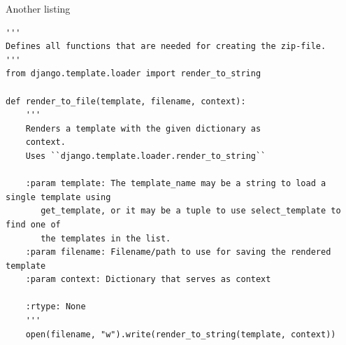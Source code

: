 Another listing

\lstset{tabsize=2,language=python}
\begin{lstlisting}[breaklines=true,frame=single,caption={Python file with doc-strings},label=lst:doc-string]
'''
Defines all functions that are needed for creating the zip-file.
'''
from django.template.loader import render_to_string

def render_to_file(template, filename, context):
    '''
    Renders a template with the given dictionary as
    context.
    Uses ``django.template.loader.render_to_string``

    :param template: The template_name may be a string to load a single template using
       get_template, or it may be a tuple to use select_template to find one of
       the templates in the list.       
    :param filename: Filename/path to use for saving the rendered template       
    :param context: Dictionary that serves as context

    :rtype: None
    '''
    open(filename, "w").write(render_to_string(template, context))
\end{lstlisting}

\begin{figure}[H]
\begin{center}
	\label{fig:api_render_to_file}
\end{center}
\end{figure}

